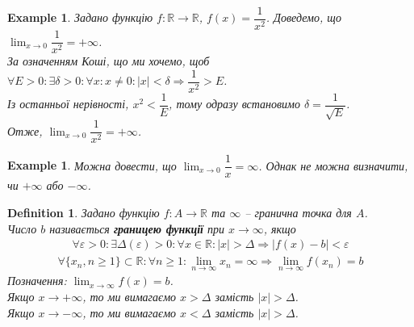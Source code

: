 \documentclass[a4paper, 14pt]{article}
\theoremstyle{theoremdd}
\theoremstyle{theoremdd}
\newtheorem{definition}[theorem]{Definition}
\theoremstyle{theoremdd}
\theoremstyle{theoremdd}
\newtheorem{example}[theorem]{Example}
\theoremstyle{theoremdd}
\theoremstyle{theoremdd}
\theoremstyle{theoremdd}
\theoremstyle{theoremdd}
\begin{document}
	\begin{example}
	Задано функцію $f \colon \mathbb{R} \to \mathbb{R}$, $f(x) = \dfrac{1}{x^2}$. Доведемо, що $\displaystyle\lim_{x \to 0} \dfrac{1}{x^2} = +\infty$.\\
	За означенням Коші, що ми хочемо, щоб $\forall E > 0: \exists \delta > 0: \forall x: x \neq 0: |x|<\delta \Rightarrow \dfrac{1}{x^2} > E$.\\
	Із останньої нерівності, $x^2 < \dfrac{1}{E}$, тому одразу встановимо $\delta = \dfrac{1}{\sqrt{E}}$.\\
	Отже, $\displaystyle\lim_{x \to 0} \dfrac{1}{x^2} = +\infty$.
\\ \iffalse %
\begin{figure} [H]
\centering
\begin{tikzpicture}[scale=0.8]
\draw[thick, ->] (-2,0)--(2,0) node[anchor = north] {$x$};
\draw[thick, ->] (0,-0.25)--(0,6) node[anchor = east] {$y$};

\draw[thick, domain=-2:-0.4, variable=\x] plot({\x}, {1/(\x*\x)});
\draw[thick, domain=0.4:2, variable=\x] plot({\x}, {1/(\x*\x)}) node[anchor = west, scale = 0.7] {$f(x) = \dfrac{1}{x^2}$};

\node at (0.2,-0.2) {$0$};
\draw[thick, blue, dashed] (0.5,4)--(0.5,0) node[anchor = north west, scale=0.9] {$0+\delta$};
\draw[thick, blue, dashed] (-0.5,4)--(-0.5,0) node[anchor = north east, scale=0.9] {$0-\delta$};
\draw[thick, red, dashed] (-0.8,4)--(0.8,4) node at (0.1,4.2) {$E$};
\end{tikzpicture}
\caption*{Всі значення функції навколо околу точці $0$ знаходяться вище за червоної лінії.}
\end{figure}
\fi %
	\end{example}
	
	\begin{example}
	Можна довести, що $\displaystyle\lim_{x \to 0} \dfrac{1}{x} = \infty$. Однак не можна визначити, чи $+\infty$ або $-\infty$.
	\end{example}
	
	\begin{definition}
	Задано функцію $f \colon A \to \mathbb{R}$ та $\infty$ -- гранична точка для $A$.\\
	Число $b$ називається \textbf{границею функції} при $x \to \infty$, якщо
	\begin{align*}
	\forall \varepsilon > 0: \exists \Delta(\varepsilon) > 0: \forall x \in \mathbb{R}: |x|>\Delta \Rightarrow |f(x)-b|<\varepsilon \tag*{означення Коші}
	\end{align*}
	\begin{align*}
	\forall \{x_n, n \geq 1\} \subset \mathbb{R}: \forall n \geq 1: \lim_{n \to \infty} x_n = \infty \Rightarrow \lim_{n \to \infty} f(x_n) = b \tag*{означення Гайне}
	\end{align*}
	Позначення: $\displaystyle \lim_{x \to \infty} f(x) = b$.\\
	Якщо $x \to +\infty$, то ми вимагаємо $x > \Delta$ замість $|x| > \Delta$.\\
	Якщо $x \to -\infty$, то ми вимагаємо $x < \Delta$ замість $|x| > \Delta$.
	\end{definition}
	
\end{document}
